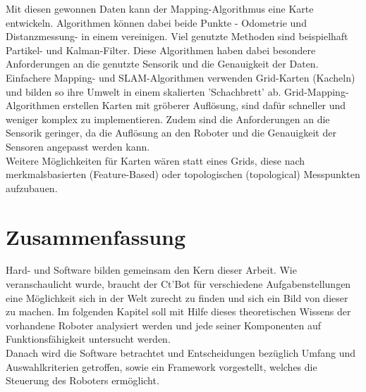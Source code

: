 \documentclass[twoside,11pt, a4paper]{report}
\begin{document}
	Mit diesen gewonnen Daten kann der Mapping-Algorithmus eine Karte entwickeln. Algorithmen können dabei beide Punkte - Odometrie und Distanzmessung- in einem vereinigen. Viel genutzte Methoden sind beispielhaft Partikel- und Kalman-Filter. Diese Algorithmen haben dabei besondere Anforderungen an die genutzte Sensorik und die Genauigkeit der Daten.\\
	Einfachere Mapping- und SLAM-Algorithmen verwenden Grid-Karten (Kacheln) und bilden so ihre Umwelt in einem skalierten 'Schachbrett' ab. Grid-Mapping-Algorithmen erstellen Karten mit gröberer Auflösung, sind dafür schneller und weniger komplex zu implementieren. Zudem sind die Anforderungen an die Sensorik geringer, da die Auflösung an den Roboter und die Genauigkeit der Sensoren angepasst werden kann.\\
	Weitere Möglichkeiten für Karten wären statt eines Grids, diese nach merkmalsbasierten (Feature-Based) oder topologischen (topological) Messpunkten aufzubauen. 
	
	
	\section{Zusammenfassung}
	Hard- und Software bilden gemeinsam den Kern dieser Arbeit. Wie veranschaulicht wurde, braucht der Ct'Bot für verschiedene Aufgabenstellungen eine Möglichkeit sich in der Welt zurecht zu finden und sich ein Bild von dieser zu machen. Im folgenden Kapitel soll mit Hilfe dieses theoretischen Wissens der vorhandene Roboter analysiert werden und jede seiner Komponenten auf Funktionsfähigkeit untersucht werden. \\
	Danach wird die Software betrachtet und Entscheidungen bezüglich Umfang und Auswahlkriterien getroffen, sowie ein Framework vorgestellt, welches die Steuerung des Roboters ermöglicht. 
	
	
	
	
	
	
	
	
	
\end{document}
